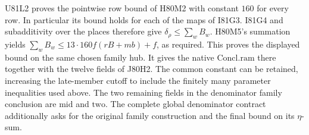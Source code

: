U81L2 proves the pointwise row bound of H80M2 with constant
$160$ for every row. In particular its bound holds for each of
the maps of I81G3. I81G4 and subadditivity over the places therefore
give $\delta_\rho\le\sum_w B_w$. H80M5's summation yields
$\sum_w B_w\le13\cdot160 f(rB+mb)+f$, as required. This
proves the displayed bound on the same chosen family hub. It gives
the native $\mathrm{Concl.ram}$ there together with the twelve
fields of J80H2. The common constant can be retained, increasing
the late-member cutoff to include the finitely many parameter
inequalities used above. The two remaining fields in the denominator
family conclusion are $\mathrm{mid}$ and $\mathrm{two}$. The complete
global denominator contract additionally asks for the original family
construction and the final bound on its $\eta$-sum.
